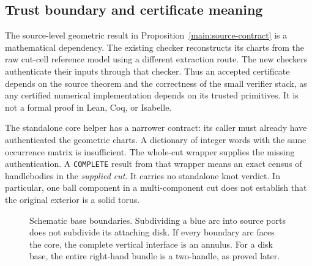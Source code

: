 \documentclass[11pt,a4paper]{article}
\theoremstyle{definition}
\newcommand{\code}[1]{\texttt{#1}}
\begin{document}
\subsection{Trust boundary and certificate meaning}

The source-level geometric result in Proposition~\ref{main:source-contract}
is a mathematical dependency.  The existing checker reconstructs its charts
from the raw cut-cell reference model using a different extraction route.
The new checkers authenticate their inputs through that checker.  Thus an
accepted certificate depends on the source theorem and the correctness of
the small verifier stack, as any certified numerical implementation depends
on its trusted primitives.  It is not a formal proof in Lean, Coq, or Isabelle.

The standalone core helper has a narrower contract: its caller must already
have authenticated the geometric charts.  A dictionary of integer words with
the same occurrence matrix is insufficient.  The whole-cut wrapper supplies
the missing authentication.  A \code{COMPLETE} result from that wrapper means
an exact census of handlebodies in the \emph{supplied cut}.  It carries no
standalone knot verdict.  In particular, one ball component in a multi-component
cut does not establish that the original exterior is a solid torus.

\begin{figure}[htbp]
\centering
{}
\caption{Schematic base boundaries.  Subdividing a blue arc into source ports
does not subdivide its attaching disk.  If every boundary arc faces the core,
the complete vertical interface is an annulus.  For a disk base, the entire
right-hand bundle is a two-handle, as proved later.}
\label{main:interface-figure}
\end{figure}
\end{document}
